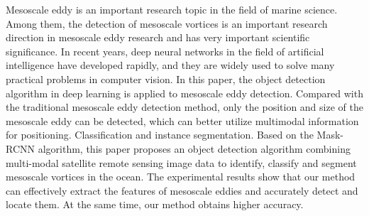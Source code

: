 \documentclass[a0paper,portrait]{baposter}
\begin{document}
\begin{poster}
{{Mesoscale eddy is an important research topic in the field of marine science. Among them, the detection of mesoscale vortices is an important research direction in mesoscale eddy research and has very important scientific significance. In recent years, deep neural networks in the field of artificial intelligence have developed rapidly, and they are widely used to solve many practical problems in computer vision. In this paper, the object detection algorithm in deep learning is applied to mesoscale eddy detection. Compared with the traditional mesoscale eddy detection method, only the position and size of the mesoscale eddy can be detected, which can better utilize multimodal information for positioning. Classification and instance segmentation. Based on the Mask-RCNN algorithm, this paper proposes an object detection algorithm combining multi-modal satellite remote sensing image data to identify, classify and segment mesoscale vortices in the ocean. The experimental results show that our method can effectively extract the features of mesoscale eddies and accurately detect and locate them. At the same time, our method obtains higher accuracy.

}




}
\end{poster}
\end{document}
